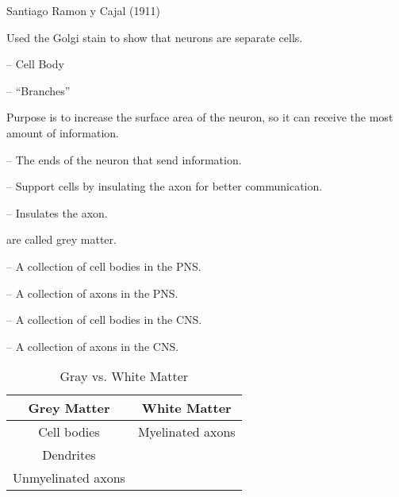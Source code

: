 \begin{coloredlist}
    \item Santiago Ramon y Cajal (1911)
    \begin{coloredlist}
        \item Used the Golgi stain to show that neurons are separate cells.
    \end{coloredlist}
    \item {} -- Cell Body
    \item {} -- ``Branches''
    \begin{coloredlist}
        \item Purpose is to increase the surface area of the neuron, so it can receive the most amount of information.
    \end{coloredlist}
    \item {} -- The ends of the neuron that send information.
    \item {} -- Support cells by insulating the axon for better communication.
    \item {} -- Insulates the axon.
    \item {} are called grey matter.
    \item {} -- A collection of cell bodies in the PNS.
    \item {} -- A collection of axons in the PNS.
    \item {} -- A collection of cell bodies in the CNS.
    \item {} -- A collection of axons in the CNS.
\end{coloredlist}

\begin{table}[htbp]
    \centering
    \begin{tabular}{cc}
        \toprule
        \textbf{Grey Matter} & \textbf{White Matter} \\ \midrule
        Cell bodies          & Myelinated axons      \\
        Dendrites            &                       \\
        Unmyelinated axons   &                       \\
        \bottomrule
    \end{tabular}
    \caption{Gray vs. White Matter}\label{tab:}
\end{table}


